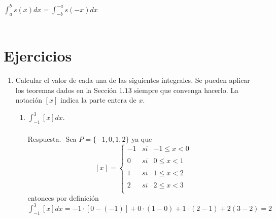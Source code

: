     \begin{teo}
	$\displaystyle\int_{a}^{b} s(x) dx = \int_{-b}^{-a} s(-x) dx$\\\\
    \end{teo}

\setcounter{section}{14}
\section{Ejercicios}

\begin{enumerate}

    \item Calcular el valor de cada una de las siguientes integrales. Se pueden aplicar los teoremas dados en la Sección $1.13$ siempre que convenga hacerlo. La notación $[x]$ indica la parte entera de $x$.

    \begin{enumerate}[\bfseries (a)]
	
	\item $\displaystyle\int_{-1}^{3} [x] dx.$\\\\ 
	    Respuesta.-\; Sea $P=\lbrace -1,0,1,2 \rbrace$ ya que 
	    $$[x] = \left\{ \begin{array}{rcl}
		-1&si& -1\leq x <0\\
		\\ 0&si& 0\leq x < 1 \\
		\\ 1&si& 1\leq x < 2 \\
		\\ 2&si& 2\leq x < 3 \\
		\end{array}\right.$$
	    entonces por definición $\displaystyle\int_{-1}^{3} [x] dx = -1\cdot [0-(-1)] + 0\cdot (1-0) + 1\cdot (2-1) + 2(3-2) = 2$\\\\


\end{enumerate}
\end{enumerate}
